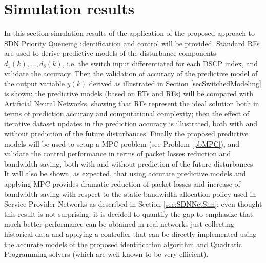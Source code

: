 \section{Simulation results}\label{secExpRes}
In this section simulation results of the application of the proposed approach to SDN Priority Queueing identification and control will be provided. Standard RFs are used to derive predictive models of the disturbance components $d_1(k),\ldots,d_8(k)$, i.e. the switch input differentiated for each DSCP index, and validate the accuracy. Then the validation of accuracy of the predictive model of the output variable $y(k)$ derived as illustrated in Section \ref{secSwitchedModeling} is shown: the predictive models (based on RTs and RFs) will be compared with Artificial Neural Networks, showing that RFs represent the ideal solution both in terms of prediction accuracy and computational complexity; then the effect of iterative dataset updates in the prediction accuracy is illustrated, both with and without prediction of the future disturbances. Finally the proposed predictive models will be used to setup a MPC problem (see Problem \ref{pbMPC}), and validate the control performance in terms of packet losses reduction and bandwidth saving, both with and without prediction of the future disturbances. It will also be shown, as expected, that using accurate predictive models and applying MPC provides dramatic reduction of packet losses and increase of bandwidth saving with respect to the static bandwidth allocation policy used in Service Provider Networks as described in Section \ref{sec:SDNNetSim}: even thought this result is not surprising, it is decided to quantify the gap to emphasize that much better performance can be obtained in real networks just collecting historical data and applying a controller that can be directly implemented using the accurate models of the proposed identification algorithm and Quadratic Programming solvers (which are well known to be very efficient).

